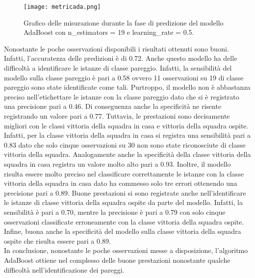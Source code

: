 \begin{figure}[]
	\begin{center}
		\texttt{[image: metricada.png]}
		\caption{Grafico delle misurazione durante la fase di predizione del modello AdaBoost con \textsf{n\_estimators} = 19 e \textsf{learning\_rate} = 0.5.
		} 
		\label{fig:adametrics}
	\end{center}
\end{figure}
Nonostante le poche osservazioni disponibili i risultati ottenuti sono buoni. Infatti, l'accuratezza delle predizioni è di 0.72. Anche questo modello ha delle difficoltà a identificare le istanze di classe pareggio. Infatti, la sensibilità del modello sulla classe pareggio è pari a 0.58 ovvero 11 osservazioni su 19 di classe pareggio sono state identificate come tali. Purtroppo, il modello non è abbastanza preciso nell’etichettare le istanze con la classe pareggio dato che si è registrato una precisione pari a 0.46. Di conseguenza anche la specificità ne risente registrando un valore pari a 0.77. Tuttavia, le prestazioni sono decisamente migliori con le classi vittoria della squadra in casa e vittoria della squadra ospite. Infatti, per la classe vittoria della squadra in casa si registra una sensibilità pari a 0.83 dato che solo cinque osservazioni su 30 non sono state riconosciute di classe vittoria della squadra. Analogamente anche la specificità della classe vittoria della squadra in casa registra un valore molto alto pari a 0.93. Inoltre, il modello risulta essere molto preciso nel classificare correttamente le istanze con la classe vittoria della squadra in casa dato ha commesso solo tre errori ottenendo una precisione pari a 0.89. Buone prestazioni si sono registrate anche nell'identificare le istanze di classe vittoria della squadra ospite da parte del modello. Infatti, la sensibilità è pari a 0.70, mentre la precisione è pari a 0.79 con solo cinque osservazioni classificate erroneamente con la classe vittoria della squadra ospite. Infine, buona anche la specificità del modello sulla classe vittoria della squadra ospite che risulta essere pari a 0.89.\\
In conclusione, nonostante le poche osservazioni messe a disposizione, l'algoritmo AdaBoost ottiene nel complesso delle buone prestazioni nonostante qualche difficoltà nell’identificazione dei pareggi.

